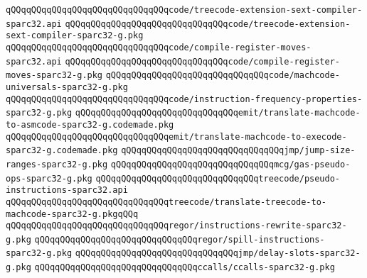 \verb|qQQqqQQqqQQqqQQqqQQqqQQqqQQqqQQqcode/treecode-extension-sext-compiler-sparc32.api|\newline
\verb|qQQqqQQqqQQqqQQqqQQqqQQqqQQqqQQqcode/treecode-extension-sext-compiler-sparc32-g.pkg|\newline
\verb|qQQqqQQqqQQqqQQqqQQqqQQqqQQqqQQqcode/compile-register-moves-sparc32.api|\newline
\verb|qQQqqQQqqQQqqQQqqQQqqQQqqQQqqQQqcode/compile-register-moves-sparc32-g.pkg|\newline
\verb|qQQqqQQqqQQqqQQqqQQqqQQqqQQqqQQqcode/machcode-universals-sparc32-g.pkg|\newline
\verb|qQQqqQQqqQQqqQQqqQQqqQQqqQQqqQQqcode/instruction-frequency-properties-sparc32-g.pkg|\newline
\verb|qQQqqQQqqQQqqQQqqQQqqQQqqQQqqQQqemit/translate-machcode-to-asmcode-sparc32-g.codemade.pkg|\newline
\verb|qQQqqQQqqQQqqQQqqQQqqQQqqQQqqQQqemit/translate-machcode-to-execode-sparc32-g.codemade.pkg|\newline
\verb|qQQqqQQqqQQqqQQqqQQqqQQqqQQqqQQqjmp/jump-size-ranges-sparc32-g.pkg|\newline
\verb|qQQqqQQqqQQqqQQqqQQqqQQqqQQqqQQqmcg/gas-pseudo-ops-sparc32-g.pkg|\newline
\verb|qQQqqQQqqQQqqQQqqQQqqQQqqQQqqQQqtreecode/pseudo-instructions-sparc32.api|\newline
\verb|qQQqqQQqqQQqqQQqqQQqqQQqqQQqqQQqtreecode/translate-treecode-to-machcode-sparc32-g.pkgqQQq|\newline
\verb|qQQqqQQqqQQqqQQqqQQqqQQqqQQqqQQqregor/instructions-rewrite-sparc32-g.pkg|\newline
\verb|qQQqqQQqqQQqqQQqqQQqqQQqqQQqqQQqregor/spill-instructions-sparc32-g.pkg|\newline
\verb|qQQqqQQqqQQqqQQqqQQqqQQqqQQqqQQqjmp/delay-slots-sparc32-g.pkg|\newline
\verb|qQQqqQQqqQQqqQQqqQQqqQQqqQQqqQQqccalls/ccalls-sparc32-g.pkg|\newline


